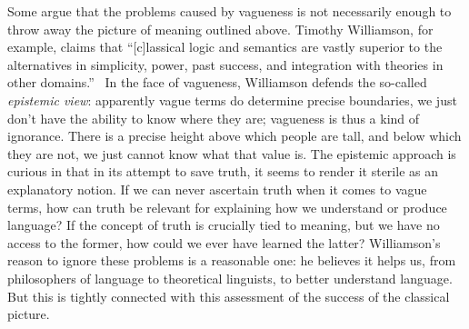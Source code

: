 \documentclass[a4paper]{article}
\begin{document}
Some argue that the problems caused by vagueness is not necessarily enough to throw away the picture of meaning outlined above.
Timothy Williamson, for example, claims that ``[c]lassical logic and semantics are vastly superior to the alternatives in simplicity, power, past success, and integration with theories in other domains.''~\parencite*[162]{williamson_vagueness_1992}
In the face of vagueness, Williamson defends the so-called \emph{epistemic view}: apparently vague terms do determine precise boundaries, we just don't have the ability to know where they are; vagueness is thus a kind of ignorance.
There is a precise height above which people are tall, and below which they are not, we just cannot know what that value is.
The epistemic approach is curious in that in its attempt to save truth, it seems to render it sterile as an explanatory notion.
If we can never ascertain truth when it comes to vague terms, how can truth be relevant for explaining how we understand or produce language?
If the concept of truth is crucially tied to meaning, but we have no access to the former, how could we ever have learned the latter?
Williamson's reason to ignore these problems is a reasonable one: he believes it helps us, from philosophers of language to theoretical linguists, to better understand language.
But this is tightly connected with this assessment of the success of the classical picture.
\end{document}
